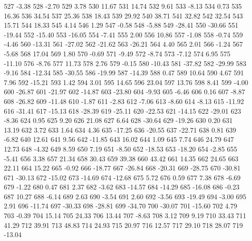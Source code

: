 527 -3.38
528 -2.70
529 3.78
530 11.67
531 14.74
532 9.61
533 -8.13
534 0.73
535 16.36
536 34.54
537 25.36
538 18.43
539 29.92
540 38.71
541 32.82
542 32.54
543 15.71
544 18.33
545 4.14
546 1.29
547 -0.58
548 -5.88
549 -28.41
550 -30.66
551 -19.44
552 -15.40
553 -16.05
554 -7.41
555 2.00
556 10.86
557 -1.08
558 -0.74
559 -4.46
560 -13.31
561 -27.02
562 -21.62
563 -26.21
564 4.40
565 2.01
566 -1.24
567 -5.68
568 17.04
569 1.80
570 -0.69
571 -9.49
572 -8.74
573 -7.12
574 6.95
575 -11.10
576 -8.76
577 11.73
578 2.76
579 -0.15
580 -10.43
581 -37.82
582 -29.99
583 -9.16
584 -12.34
585 -30.55
586 -19.99
587 -14.39
588 0.47
589 10.64
590 4.67
591 7.96
592 -15.21
593 1.42
594 3.01
595 14.65
596 23.04
597 13.76
598 8.41
599 -4.00
600 -26.87
601 -21.97
602 -14.87
603 -23.80
604 -9.93
605 -6.46
606 0.16
607 -8.87
608 -26.82
609 -11.48
610 -1.87
611 -2.83
612 -7.06
613 -8.60
614 -8.13
615 -11.92
616 -31.41
617 -15.13
618 -28.39
619 -25.11
620 -22.53
621 -14.15
622 -29.01
623 -8.36
624 0.95
625 9.20
626 21.08
627 6.64
628 -30.64
629 -19.26
630 0.20
631 13.19
632 3.72
633 1.64
634 4.36
635 -17.25
636 -20.55
637 -22.71
638 0.81
639 -6.82
640 12.61
641 9.56
642 -11.85
643 16.02
644 1.09
645 7.74
646 24.79
647 12.73
648 -4.32
649 8.59
650 7.19
651 -8.50
652 -18.53
653 -18.20
654 -2.85
655 -5.41
656 3.38
657 21.34
658 30.43
659 39.38
660 43.42
661 14.35
662 24.65
663 22.11
664 15.22
665 -0.92
666 -18.77
667 -26.84
668 -20.31
669 -28.75
670 -30.81
671 -30.13
672 -15.02
673 -14.69
674 -12.68
675 5.72
676 0.59
677 7.38
678 -6.69
679 -1.22
680 0.47
681 2.37
682 -3.62
683 -14.57
684 -14.29
685 -16.08
686 -0.23
687 10.27
688 -6.14
689 2.63
690 -3.54
691 2.60
692 -3.56
693 -19.49
694 -3.00
695 2.91
696 -11.74
697 -30.33
698 -28.81
699 -34.70
700 -30.07
701 -15.60
702 4.79
703 -0.39
704 15.14
705 24.33
706 13.44
707 -8.63
708 3.12
709 9.19
710 33.43
711 41.29
712 39.91
713 48.83
714 24.93
715 20.97
716 12.57
717 29.10
718 28.07
719 -13.04
